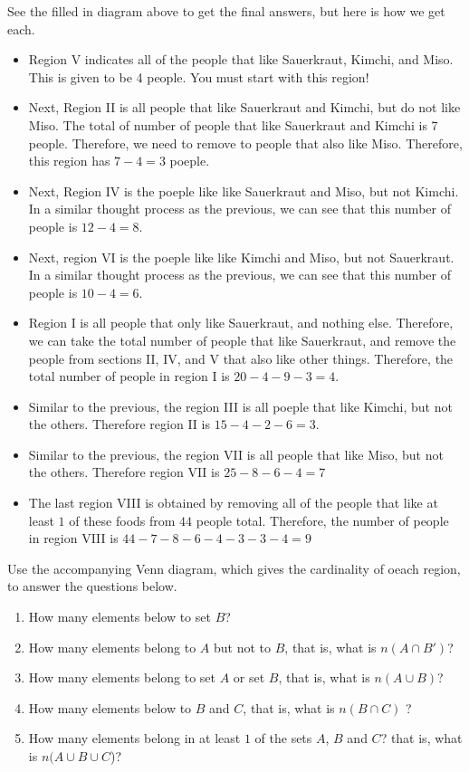 \documentclass[addpoints,12pt]{exam}
\begin{document}
\begin{questions}
\begin{solution}
    See the filled in diagram above to get the final answers, but here is how we get each. 
		\begin{itemize}
		    \item Region V indicates all of the people that like Sauerkraut, Kimchi, and Miso. This is given to be 4 people. You must start with this region! 
				\item Next, Region II is all people that like Sauerkraut and Kimchi, but do not like Miso. The total of number of people that like Sauerkraut and Kimchi is 7 people. Therefore, we need to remove to people that also like Miso. Therefore, this region has $7-4=3$ poeple. 
				\item Next, Region  IV is the poeple like like Sauerkraut and Miso, but not Kimchi. In a similar thought process as the previous, we can see that this number of people is $12 - 4 = 8 $.  
				\item Next, region VI is the poeple like like Kimchi and Miso, but not Sauerkraut. In a similar thought process as the previous, we can see that this number of people is $10 - 4 = 6 $.  
				\item Region I is all people that only like Sauerkraut, and nothing else. Therefore, we can take the total number of people that like Sauerkraut, and remove the people from sections II, IV, and V that also like other things. Therefore, the total number of people in region I is  $20-4-9-3 = 4$. 
				\item Similar to the previous, the region III is all poeple that like Kimchi, but not the others. Therefore region II is $15-4-2-6= 3$. 
				\item Similar to the previous, the region VII is all people that like Miso, but not the others. Therefore region VII is $25-8-6-4 = 7$
				\item The last region VIII is obtained by removing all of the people that like at least $1$ of these foods from $44$ people total. Therefore, the number of people in region VIII is $44-7-8-6-4-3-3-4 = 9$

		\end{itemize}
\end{solution}
\newpage

\question Use the accompanying Venn diagram, which gives the cardinality of oeach region, to answer the questions below. 

\begin{enumerate}[label = \alph*)]
    \item How many elements below to set $B$? 
		\item How many elements belong to $A$ but not to $B$, that is, what is $n(A\cap B ')$?
		\item How many elements belong to set $A$ or set $B$,  that is, what is $n(A\cup B)$? 
		\item How many elements below to $B$ and $C$, that is, what is $n(B\cap C)$ ?
		\item How many elements belong in at least $1$ of the sets $A$, $B$ and $C$? that is, what is $n(A\cup B\cup C$)?


\end{enumerate}
\end{questions}
\end{document}
